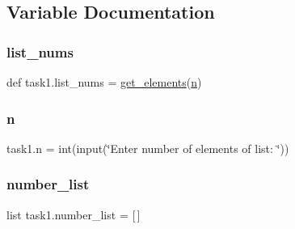 \subsection{Variable Documentation}
\mbox{\label{namespacetask1_a48644f9ab3727dce9978f2f3afba1492}} 
\subsubsection{\texorpdfstring{list\+\_\+nums}{list\_nums}}
{\footnotesize\ttfamily def task1.\+list\+\_\+nums = \hyperlink{namespacetask1_a03f2500f1b4bf94c028ad81924233025}{get\+\_\+elements}(\hyperlink{namespacetask1_ade57eab2d5ddbd9bec59005ec4c19338}{n})}

\mbox{\label{namespacetask1_ade57eab2d5ddbd9bec59005ec4c19338}} 
\subsubsection{\texorpdfstring{n}{n}}
{\footnotesize\ttfamily task1.\+n = int(input(\char`\"{}Enter number of elements of list\+: \char`\"{}))}

\mbox{\label{namespacetask1_a4229f894904b6567dcab881d116dc574}} 
\subsubsection{\texorpdfstring{number\+\_\+list}{number\_list}}
{\footnotesize\ttfamily list task1.\+number\+\_\+list = \mbox{[}$\,$\mbox{]}}

